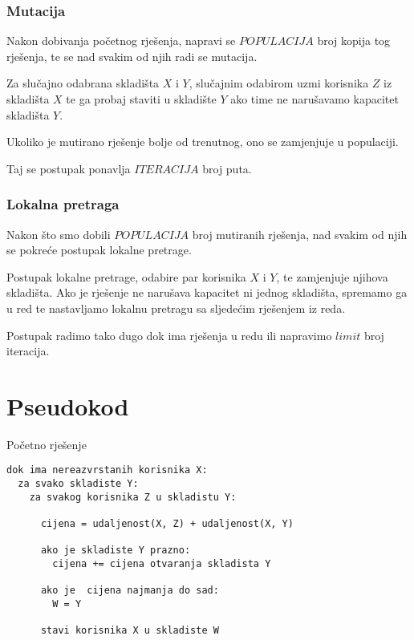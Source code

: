 \documentclass[utf8]{beamer}
\begin{document}
\begin{frame}
\frametitle{Mutacija}

Nakon dobivanja početnog rješenja, napravi se $POPULACIJA$ broj kopija tog rješenja, te se nad svakim od njih radi se mutacija.

Za slučajno odabrana skladišta $X$ i $Y$, slučajnim odabirom uzmi korisnika $Z$ iz skladišta $X$ te ga probaj staviti u skladište $Y$ ako time ne narušavamo kapacitet skladišta $Y$.

\vspace{5mm}

Ukoliko je mutirano rješenje bolje od trenutnog, ono se zamjenjuje u populaciji.

\vspace{5mm}

Taj se postupak ponavlja $ITERACIJA$ broj puta.

\end{frame}

\begin{frame}
\frametitle{Lokalna pretraga}

Nakon što smo dobili $POPULACIJA$ broj mutiranih rješenja, nad svakim od njih se pokreće postupak lokalne pretrage. 

\vspace{5mm}

Postupak lokalne pretrage, odabire par korisnika $X$ i $Y$, te zamjenjuje njihova skladišta. Ako je rješenje ne narušava kapacitet ni jednog skladišta, spremamo ga u red te nastavljamo lokalnu pretragu sa sljedećim rješenjem iz reda.

\vspace{5mm}

Postupak radimo tako dugo dok ima rješenja u redu ili napravimo $limit$ broj iteracija.

\end{frame}

\section{Pseudokod}
\begin{frame}[fragile]{Početno rješenje}
\begin{lstlisting}
dok ima nereazvrstanih korisnika X:
  za svako skladiste Y:
    za svakog korisnika Z u skladistu Y:	
		
      cijena = udaljenost(X, Z) + udaljenost(X, Y)
			
      ako je skladiste Y prazno:
        cijena += cijena otvaranja skladista Y
		
      ako je  cijena najmanja do sad:
        W = Y
	
      stavi korisnika X u skladiste W
\end{lstlisting}
\end{frame}
\end{document}
